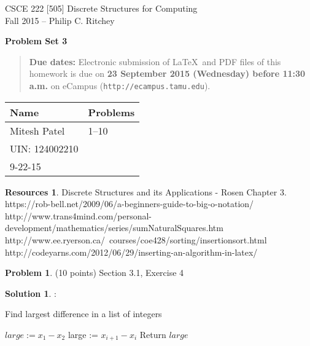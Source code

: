 \documentclass{article}
\theoremstyle{definition}
\newtheorem{problem}{Problem}
\newtheorem*{solution}{Solution}
\newtheorem*{resources}{Resources}
\newcommand{\names}[5]{
\begin{tabular}{|ll|}
\hline
\textbf{Name}  & \textbf{Problems}\\
\hline
#1 & 1--10\\
#2 & #3\\
#4 & #5\\
\hline
\end{tabular}}
\newcommand{\problemset}[1]{\begin{center}\textbf{Problem Set #1}\end{center}}
\newcommand{\duedate}[1]{\begin{quote}\textbf{Due dates:} Electronic
    submission of \LaTeX\ and PDF files of this homework is due on
    \textbf{#1} on eCampus (\texttt{http://ecampus.tamu.edu}). 
    \end{quote}}
\begin{document}
\begin{center}
{\large
CSCE 222 [505] Discrete Structures for Computing\\[.5ex]
Fall 2015 -- Philip C. Ritchey\\}
\end{center}

\problemset{3}

\duedate{23 September 2015 (Wednesday) before 11:30 a.m.}

\names{Mitesh Patel}
{UIN: 124002210}{}
{9-22-15}{}

\begin{resources} Discrete Structures and its Applications - Rosen Chapter 3. \newline https://rob-bell.net/2009/06/a-beginners-guide-to-big-o-notation/ \newline http://www.trans4mind.com/personal-development/mathematics/series/sumNaturalSquares.htm \newline http://www.ee.ryerson.ca/~courses/coe428/sorting/insertionsort.html \newline http://codeyarns.com/2012/06/29/inserting-an-algorithm-in-latex/ \end{resources}

\bigskip

\begin{problem} (10 points) Section 3.1, Exercise 4
\end{problem}
\begin{solution}:
\\

\begin{algorithm}
\caption{Find largest difference in a list of integers}
\label{}
\begin{algorithmic}[1]
    \State $large := x_1 - x_2$
        large := $x_{i+1} - x_i$
        \EndIf
	\EndFor
	\State Return $large$
\EndProcedure
\end{algorithmic}
\end{algorithm}
\end{solution}
\end{document}
